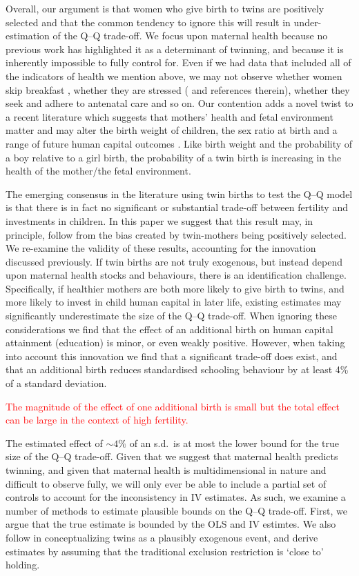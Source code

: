\documentclass[subeqn]{article}
\begin{document}
\begin{spacing}{1.4}
Overall, our argument is that women who give birth to twins are positively 
selected and that the common tendency to ignore this will result in under-%
estimation of the Q--Q trade-off. We focus upon maternal health because no 
previous work has highlighted it as a determinant of twinning, and because it is 
inherently impossible to fully control for. Even if we had data that included 
all of the indicators of health we mention above, we may not observe whether 
women skip breakfast \citep{MazumderSeeskin2014}, whether they are stressed 
(\citet{Blacketal2014} and references therein), whether they seek and adhere to 
antenatal care and so on. Our contention adds a novel twist to a recent 
literature which suggests that mothers' health and fetal environment matter and 
may alter the birth weight of children, the sex ratio at birth and a range of 
future human capital outcomes \citep{Almondetal2011,BhalotraRawlings2013,
Barker1995}. Like birth weight and the probability of a boy relative to a girl 
birth, the probability of a twin birth is increasing in the health of the 
mother/the fetal environment.

The emerging consensus in the literature using twin births to test the Q--Q 
model is that there is in fact no significant or substantial trade-off between 
fertility and investments in children. In this paper we suggest that this result 
may, in principle, follow from the bias created by twin-mothers being positively 
selected. We re-examine the validity of these results, accounting for the 
innovation discussed previously.  If twin births are not truly exogenous, but 
instead depend upon maternal health stocks and behaviours, there is an 
identification challenge.  Specifically, if healthier mothers are both more 
likely to give birth to twins, and more likely to invest in child human capital 
in later life, existing estimates may significantly underestimate the size of 
the Q--Q trade-off.  When ignoring these considerations we find that the effect 
of an additional birth on human capital attainment (education) is minor, or even 
weakly positive. However, when taking into account this innovation we find that 
a significant trade-off does exist, and that an additional birth reduces 
standardised schooling behaviour by at least 4\% of a standard deviation.

\textcolor{red}{The magnitude of the effect of one additional birth is small 
but the total effect can be large in the context of high fertility.}


The estimated effect of $\sim 4\%$ of an s.d.\ is at most the lower bound for 
the true size of the Q--Q trade-off. Given that we suggest that maternal health 
predicts twinning, and given that maternal health is multidimensional in nature 
and difficult to observe fully, we will only ever be able to include a partial 
set of controls to account for the inconsistency in IV estimates. As such, we 
examine a number of methods to estimate plausible bounds on the Q--Q trade-off. 
First, we argue that the true estimate is bounded by the OLS and IV estimtes. 
We also follow \citet{Conleyetal2012} in conceptualizing twins as a plausibly 
exogenous event, and derive estimates by assuming that the traditional exclusion 
restriction is `close to' holding.


\end{spacing}
\end{document}
